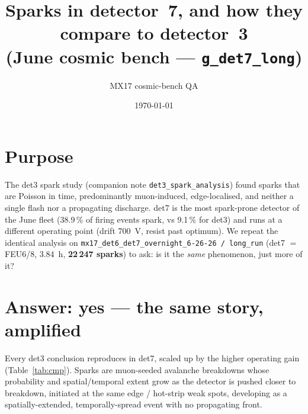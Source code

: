 \documentclass[11pt]{article}
\title{\vspace{-2.5em}Sparks in detector~7, and how they compare to detector~3\\
\large (June cosmic bench --- \texttt{g\_det7\_long})}
\author{MX17 cosmic-bench QA}
\date{\today}
\begin{document}
\maketitle
\vspace{-1.5em}

\section{Purpose}
The det3 spark study (companion note \texttt{det3\_spark\_analysis}) found sparks that are
Poisson in time, predominantly muon-induced, edge-localised, and neither a single flash
nor a propagating discharge. det7 is the most spark-prone detector of the June fleet
(38.9\,\% of firing events spark, vs 9.1\,\% for det3) and runs at a different operating
point (drift 700~V, resist past optimum). We repeat the identical analysis on
\texttt{mx17\_det6\_det7\_overnight\_6-26-26 / long\_run} (det7 $=$ FEU6/8, 3.84~h,
\textbf{22\,247 sparks}) to ask: is it the \emph{same} phenomenon, just more of it?

\section{Answer: yes --- the same story, amplified}
Every det3 conclusion reproduces in det7, scaled up by the higher operating gain
(Table~\ref{tab:cmp}). Sparks are muon-seeded avalanche breakdowns whose probability and
spatial/temporal extent grow as the detector is pushed closer to breakdown, initiated at
the same edge / hot-strip weak spots, developing as a spatially-extended,
temporally-spread event with no propagating front.
\end{document}
